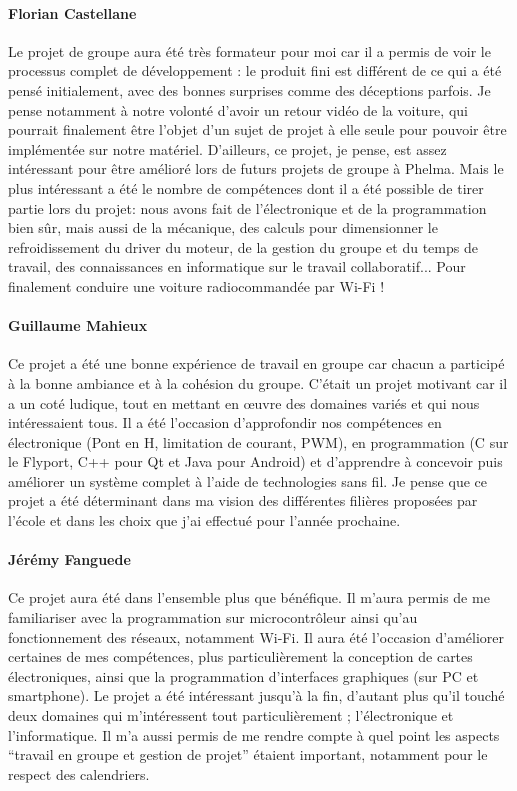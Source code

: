 \documentclass[a4paper,12pt]{report}
\begin{document}
	\paragraph{Florian Castellane}
	Le projet de groupe aura été très formateur pour moi car il a permis de voir le processus complet de développement : le produit fini est différent de ce qui a été pensé initialement, avec des bonnes surprises comme des déceptions parfois. Je pense notamment à notre volonté d’avoir un retour vidéo de la voiture, qui pourrait finalement être l’objet d’un sujet de projet à elle seule pour pouvoir être implémentée sur notre matériel. D’ailleurs, ce projet, je pense, est assez intéressant pour être amélioré lors de futurs projets de groupe à Phelma. Mais le plus intéressant a été le nombre de compétences dont il a été possible de tirer partie lors du projet: nous avons fait de l’électronique et de la programmation bien sûr, mais aussi de la mécanique, des calculs pour dimensionner le refroidissement du driver du moteur, de la gestion du groupe et du temps de travail, des connaissances en informatique sur le travail collaboratif... Pour finalement conduire une voiture radiocommandée par Wi-Fi !
	
	\paragraph{Guillaume Mahieux}
	Ce projet a été une bonne expérience de travail en groupe car chacun a participé à la bonne ambiance et à la cohésion du groupe. C’était un projet motivant car il a un coté ludique, tout en mettant en œuvre des domaines variés et qui nous intéressaient tous. Il a été l’occasion d’approfondir nos compétences en électronique (Pont en H, limitation de courant, PWM), en programmation (C sur le Flyport, C++ pour Qt et Java pour Android) et d’apprendre à concevoir puis améliorer un système complet à l’aide de technologies sans fil. Je pense que ce projet a été déterminant dans ma vision des différentes filières proposées par l’école et dans les choix que j’ai effectué pour l’année prochaine.
	
	\paragraph{Jérémy Fanguede}
	Ce projet aura été dans l’ensemble plus que bénéfique. Il m’aura permis de me familiariser avec la programmation sur microcontrôleur ainsi qu’au fonctionnement des réseaux, notamment Wi-Fi. Il aura été l’occasion d’améliorer certaines de mes compétences, plus particulièrement la conception de cartes électroniques, ainsi que la programmation d’interfaces graphiques (sur PC et smartphone).
Le projet a été intéressant jusqu’à la fin, d’autant plus qu’il touché deux domaines qui m’intéressent tout particulièrement ; l’électronique et l’informatique. Il m’a aussi permis de me rendre compte à quel point les aspects “travail en groupe et gestion de projet” étaient  important, notamment pour le respect des calendriers.
	
\end{document}
